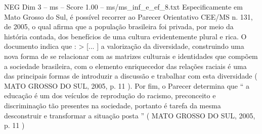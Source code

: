 \begin{textsample}{NEG Dim 3 – ms – Score 1.00 – ms/ms\_inf\_e\_ef\_8.txt}
Especificamente em Mato Grosso do Sul, é possível recorrer ao Parecer Orientativo CEE/MS n. 131, de 2005, o qual afirma que a população brasileira foi privada, por meio da história contada, dos benefícios de uma cultura evidentemente plural e rica.
O documento indica que : > [... ] a valorização da diversidade, construindo uma nova forma de se relacionar com as matrizes culturais e identidades que compõem a sociedade brasileira, com o elemento enriquecedor das relações raciais é uma das principais formas de introduzir a discussão e trabalhar com esta diversidade ( MATO GROSSO DO SUL, 2005, p. 11 ).
Por fim, o Parecer determina que “ a educação é um dos veículos de reprodução do racismo, preconceito e discriminação tão presentes na sociedade, portanto é tarefa da mesma desconstruir e transformar a situação posta ” ( MATO GROSSO DO SUL, 2005, p. 11 )

\end{textsample}
